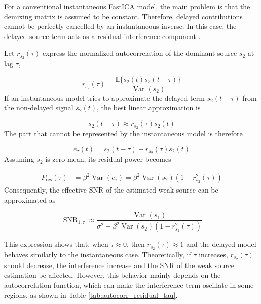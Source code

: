 \clearpage

For a conventional instantaneous FastICA model, the main problem is that the demixing matrix is
assumed to be constant. Therefore, delayed contributions cannot be perfectly
cancelled by an instantaneous inverse. In this case, the delayed source term
acts as a residual interference component \cite{parra_convolutive_2000}.

Let $r_{s_2}(\tau)$ express the normalized autocorrelation of the dominant source
$s_2$ at lag $\tau$,

\begin{equation}
r_{s_2}(\tau)=
\frac{\mathbb{E}\{s_2(t)s_2(t-\tau)\}}
{\operatorname{Var}(s_2)}
\end{equation}
If an instantaneous model tries to approximate the delayed term $s_2(t-\tau)$
from the non-delayed signal $s_2(t)$, the best linear approximation is

\begin{equation}
s_2(t-\tau) \approx r_{s_2}(\tau)s_2(t)
\end{equation} The part that cannot be represented by the instantaneous model is therefore

\begin{equation}
e_\tau(t)=s_2(t-\tau)-r_{s_2}(\tau)s_2(t)
\end{equation}
Assuming $s_2$ is zero-mean, its residual power becomes

\begin{equation}
\begin{aligned}
P_{\mathrm{res}}(\tau)
&= \beta^2 \operatorname{Var}(e_\tau)
= \beta^2 \operatorname{Var}(s_2)
\left(1-r_{s_2}^2(\tau)\right)
\end{aligned}
\end{equation}Consequently, the effective SNR of the estimated weak source can be approximated as

\begin{equation}
\operatorname{SNR}_{1,\tau}
\approx
\frac{\operatorname{Var}(s_1)}
{\sigma^2+
\beta^2 \operatorname{Var}(s_2)
\left(1-r_{s_2}^2(\tau)\right)}
\label{eq:delay_contamination_term}
\end{equation}

This expression shows that, when $\tau \approx 0$, then
$r_{s_2}(\tau)\approx 1$ and the delayed model behaves similarly to the
instantaneous case. Theoretically, if $\tau$ increases, $r_{s_2}(\tau)$ should decrease, the interference increase and the SNR of the weak source estimation be affected. However, this behavior mainly depends on the autocorrelation function, which can make the interference term oscillate in some regions, as shown in Table \ref{tab:autocorr_residual_tau}. 

